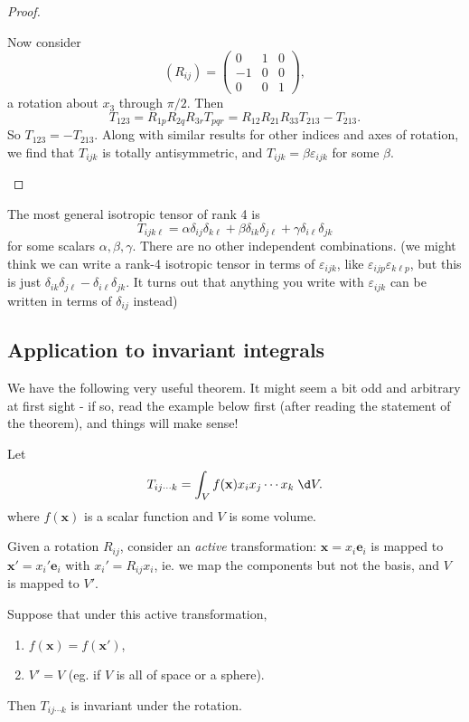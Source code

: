 \documentclass[a4paper]{article}
\begin{document}
\begin{proof}
\begin{enumerate}
      Now consider
      \[
        (R_{ij}) = 
        \begin{pmatrix}
          0 & 1 & 0\\
          -1 & 0 & 0\\
          0 & 0 & 1
        \end{pmatrix},
      \]
      a rotation about $x_3$ through $\pi/2$. Then
      \[
        T_{123} = R_{1p}R_{2q}R_{3r}T_{pqr} = R_{12}R_{21}R_{33}T_{213} -T_{213}.
      \]
      So $T_{123} = -T_{213}$. Along with similar results for other indices and axes of rotation, we find that $T_{ijk}$ is totally antisymmetric, and $T_{ijk} = \beta \varepsilon_{ijk}$ for some $\beta$.
  \end{enumerate}
\end{proof}
\begin{eg}
  The most general isotropic tensor of rank 4 is
  \[
    T_{ijk\ell} = \alpha \delta_{ij}\delta_{k\ell} + \beta \delta_{ik}\delta_{j\ell} + \gamma \delta_{i\ell}\delta_{jk}
  \]
  for some scalars $\alpha, \beta, \gamma$. There are no other independent combinations. (we might think we can write a rank-4 isotropic tensor in terms of $\varepsilon_{ijk}$, like $\varepsilon_{ijp}\varepsilon_{k\ell p}$, but this is just $\delta_{ik}\delta_{j\ell} - \delta_{i\ell}\delta_{jk}$. It turns out that anything you write with $\varepsilon_{ijk}$ can be written in terms of $\delta_{ij}$ instead)
\end{eg}

\subsection{Application to invariant integrals}
We have the following very useful theorem. It might seem a bit odd and arbitrary at first sight - if so, read the example below first (after reading the statement of the theorem), and things will make sense!
\begin{thm}
  Let
  \[
    T_{ij\cdots k} = \int_V f(\mathbf{x}) x_i x_j \cdots x_k\;\d V.
  \]
  where $f(\mathbf{x})$ is a scalar function and $V$ is some volume.

  Given a rotation $R_{ij}$, consider an \emph{active} transformation: $\mathbf{x} = x_i \mathbf{e}_i$ is mapped to $\mathbf{x}' = x_i' \mathbf{e}_i$ with $x_i' = R_{ij} x_i$, ie. we map the components but not the basis, and $V$ is mapped to $V'$.

  Suppose that under this active transformation,
  \begin{enumerate}
    \item $f(\mathbf{x}) = f(\mathbf{x}')$,
    \item $V' = V$ (eg. if $V$ is all of space or a sphere).
  \end{enumerate}
  Then $T_{ij\cdots k}$ is invariant under the rotation.
\end{thm}
\end{document}
